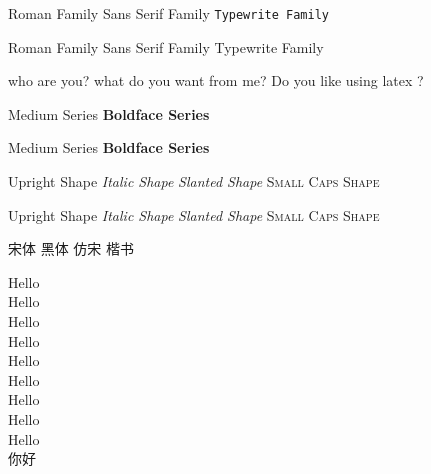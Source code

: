 \documentclass[10pt]{article}%
\begin{document}
    \textrm{Roman Family }\textsf{Sans Serif Family} \texttt{Typewrite Family }

    \rmfamily Roman Family \sffamily Sans Serif Family  \ttfamily Typewrite Family

    \sffamily who are you?  \rmfamily what do you want from me? Do you like using latex ?

    \textmd{Medium Series} \textbf{Boldface Series}

    {\mdseries Medium Series} {\bfseries Boldface Series}

    \textup{Upright Shape} \textit{Italic Shape} \textsl{Slanted Shape} \textsc{Small Caps Shape}

    {\upshape Upright Shape} {\itshape Italic Shape} {\slshape Slanted Shape} {\scshape Small Caps Shape}

    {\songti 宋体} {\heiti 黑体} {\fangsong 仿宋} {\kaishu 楷书}


    {\tiny Hello}\\
    {\scriptsize Hello}\\
    {\footnotesize Hello}\\
    {\small Hello}\\
    {\normalsize Hello}\\
    {\large Hello}\\
    {\Large Hello}\\
    {\huge Hello}\\
    {\Huge Hello}\\

     你好
\end{document}
